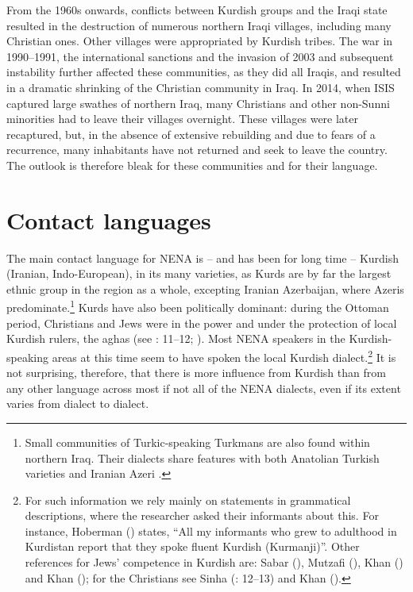\documentclass[output=paper]{langsci/langscibook}
\begin{document}
From the 1960s onwards, conflicts between Kurdish groups and the Iraqi state resulted in the destruction of numerous northern Iraqi villages, including many Christian ones. Other villages were appropriated by Kurdish tribes. The war in 1990–1991, the international sanctions and the invasion of 2003 and subsequent instability further affected these communities, as they did all Iraqis, and resulted in a dramatic shrinking of the Christian community in Iraq. In 2014, when ISIS captured large swathes of northern Iraq, many Christians and other non-Sunni minorities had to leave their villages overnight. These villages were later recaptured, but, in the absence of extensive rebuilding and due to fears of a recurrence, many inhabitants have not returned and seek to leave the country. The outlook is therefore bleak for these communities and for their language.

\section{\label{bkm:Ref534214034}Contact languages}

The main contact language for NENA is – and has been for long time – Kurdish (Iranian, Indo-European), in its many varieties, as Kurds are by far the largest ethnic group in the region as a whole, excepting Iranian Azerbaijan, where Azeris predominate.\footnote{Small communities of Turkic-speaking Turkmans are also found within northern Iraq. Their dialects share features with both Anatolian Turkish varieties and Iranian Azeri \citep{Bulut2007}.} Kurds have also been politically dominant: during the Ottoman period, Christians and Jews were in the power and under the protection of local Kurdish rulers, the aghas (see \citealt{Sinha2000}: 11–12; \citealt[223]{BrauerPatai1993}). Most NENA speakers in the Kurdish-speaking areas at this time seem to have spoken the local Kurdish dialect.\footnote{For such information we rely mainly on statements in grammatical descriptions, where the researcher asked their informants about this. For instance, Hoberman (\citeyear[9]{Hoberman1989}) states, ``All my informants who grew to adulthood in Kurdistan report that they spoke fluent Kurdish (Kurmanji)''. Other references for Jews’ competence in Kurdish are: Sabar (\citeyear[216]{Sabar1978}), Mutzafi (\citeyear[5]{Mutzafi2004}), Khan (\citeyear[198]{Khan2007}) and Khan (\citeyear[11]{Khan2009}); for the Christians see Sinha (\citeyear{Sinha2000}: 12–13) and Khan (\citeyear[18]{Khan2008}).} It is not surprising, therefore, that there is more influence from Kurdish than from any other language across most if not all of the NENA dialects, even if its extent varies from dialect to dialect.
\end{document}
